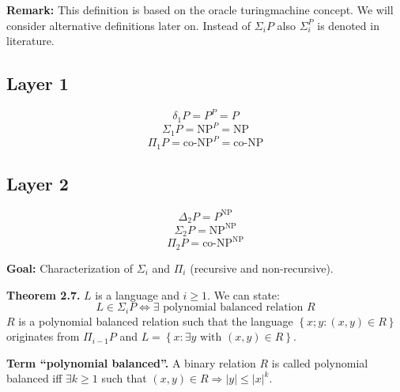 \documentclass[a4paper]{article}
\newcommand{\card}[1]{|#1|}
\newcommand{\set}[1]{\left\{#1\right\}}
\begin{document}
\textbf{Remark:}
This definition is based on the oracle turingmachine concept.
We will consider alternative definitions later on.
Instead of $\Sigma_i P$ also $\Sigma_i^P$ is denoted in literature.

\subsection{Layer 1}
%
\[
  \delta_1 P = P^P = P
\] \[
  \Sigma_1 P = \text{NP}^P = \text{NP}
\] \[
  \Pi_1 P = \text{co-NP}^P = \text{co-NP}
\]

\subsection{Layer 2}
%
\[
  \Delta_2 P = P^{\text{NP}}
\] \[
  \Sigma_2 P = \text{NP}^{\text{NP}}
\] \[
  \Pi_2 P = \text{co-NP}^{\text{NP}}
\]

\textbf{Goal:}
Characterization of $\Sigma_i$ and $\Pi_i$ (recursive and non-recursive).

\textbf{Theorem 2.7.}
$L$ is a language and $i \geq 1$. We can state:
\[
  L \in \Sigma_i P  \Leftrightarrow  \exists \text{ polynomial balanced relation } R
\]
$R$ is a polynomial balanced relation such that the language $\set{x;y: (x, y) \in R}$ originates from $\Pi_{i-1} P$ and $L = \set{x : \exists y \text{ with } (x, y) \in R}$.

\textbf{Term ``polynomial balanced''.}
A binary relation $R$ is called polynomial balanced iff
$\exists k \geq 1$ such that $(x, y) \in R \Rightarrow \card{y} \leq \card{x}^k$.
\end{document}
